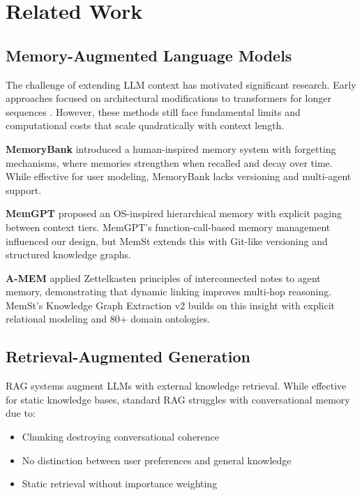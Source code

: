\section{Related Work}
\label{sec:related_work}

\subsection{Memory-Augmented Language Models}

The challenge of extending LLM context has motivated significant research. Early approaches focused on architectural modifications to transformers for longer sequences \citep{bulatov2022recurrent, liu2023think}. However, these methods still face fundamental limits and computational costs that scale quadratically with context length.

\textbf{MemoryBank} \citep{zhong2024memorybank} introduced a human-inspired memory system with forgetting mechanisms, where memories strengthen when recalled and decay over time. While effective for user modeling, MemoryBank lacks versioning and multi-agent support.

\textbf{MemGPT} \citep{packer2023memgpt} proposed an OS-inspired hierarchical memory with explicit paging between context tiers. MemGPT's function-call-based memory management influenced our design, but MemSt extends this with Git-like versioning and structured knowledge graphs.

\textbf{A-MEM} \citep{xu2025mem} applied Zettelkasten principles of interconnected notes to agent memory, demonstrating that dynamic linking improves multi-hop reasoning. MemSt's Knowledge Graph Extraction v2 builds on this insight with explicit relational modeling and 80+ domain ontologies.

\subsection{Retrieval-Augmented Generation}

RAG systems \citep{lewis2020retrieval} augment LLMs with external knowledge retrieval. While effective for static knowledge bases, standard RAG struggles with conversational memory due to:
\begin{itemize}
    \item Chunking destroying conversational coherence
    \item No distinction between user preferences and general knowledge
    \item Static retrieval without importance weighting
\end{itemize}

